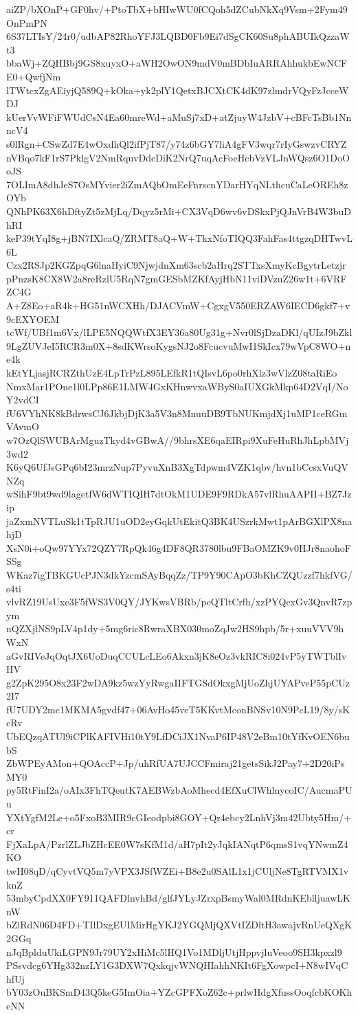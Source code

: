 aiZP/bXOnP+GF0hv/+PtoTbX+bHIwWU0fCQoh5dZCubNkXq9Vsm+2Fym49OnPmPN
6S37LTIsY/24r0/udbAP82RhoYFJ3LQBD0Fb9Ei7dSgCK60Su8phABUIkQzzaWt3
bbaWj+ZQHBbj9GS8xuyxO+aWH2OwON9mdV0mBDbIuARRAhhukbEwNCFE0+QwfjNm
lTWtcxZgAEiyjQ589Q+kOka+yk2plY1QetxBJCXtCK4dK97zlmdrVQyFzJcceWDJ
kUerVvWFiFWUdCsN4Ea60mreWd+aMuSj7xD+atZjuyW4JzbV+cBFcTsBb1NnncV4
s0lRgn+CSwZd7E4wOxdhQl2ifPjT87/y74z6bGY7liA4gFV3wqr7rIyGswzvCRYZ
nVBqo7kF1rS7PklgV2NmRquvDdcDiK2NrQ7uqAcFoeHcbVzVLJnWQsz6O1DoOoJS
7OLImA8dhJeS7OsMYvier2iZmAQbOmEeFnrscnYDarHYqNLthcuCaLeOREh8zOYb
QNhPK63X6hDftyZt5zMjLq/Dqyz5rMi+CX3VqD6wv6vDSkxPjQJnVrB4W3buDhRI
keP39tYqI8g+jBN7IXlcaQ/ZRMT8aQ+W+TkxNfoTIQQ3FahFas4ttgzqDHTwvL6L
Czx2RSJp2KGZpqG6lnaHyiC9NjwjdnXm63scb2aHrq2STTxsXmyKcBgytrLetzjr
pPnzsK8CX8W2a8reRzlU5RqN7gmGESbMZKfAyjHbN11viDVzuZ26w1t+6VRFZC4G
A+Z8Eo+aR4k+HG51nWCXHh/DJACVmW+CgxgV550ERZAW6IECD6gkf7+v9cEXYOEM
tcWf/UBf1m6Vx/lLPE5NQQWtfX3EY36a80Ug31g+Nvr0lSjDzaDKl/qUIzJ9bZkl
9LgZUVJeI5RCR3m0X+8sdKWrsoKygsNJ2o8FcucvuMwI1SkIcx79wVpC8WO+ne4k
kEtYLjasjRCRZthUzE4LpTrPzL895LEfkR1tQIsvL6po0rhXlz3wVlzZ08taRiEo
NmxMar1POne1l0LPp86E1LMW4GxKHnwvxaWByS0aIUXGkMkp64D2VqI/NoY2vdCI
fU6VYhNK8kBdrwsCJ6JkbjDjK3a5V3n8MnuuDB9TbNUKmjdXj1uMP1ceRGmVAvmO
w7OzQlSWUBArMguzTkyd4vGBwA//9bhrsXE6qaEIRpi9XuFeHuRhJhLpbMVj3wd2
K6yQ6UfJsGPq6bI23mrzNup7PyvuXnB3XgTdpwm4VZK1qbv/hvn1bCcsxVuQVNZq
wSihF9bt9wd9lagetfW6dWTIQIH7dtOkM1UDE9F9RDkA57vlRhuAAPII+BZ7Jzip
jaZxmNVTLuSk1tTpRJU1uOD2eyGqkUtEkitQ3BK4USzrkMwt1pArBGXlPX8nahjD
XsN0i+oQw97YYx72QZY7RpQk46g4DF8QR3780lbu9FBaOMZK9v0HJr8naohoFSSg
WKaz7igTBKGUcPJN3dkYzcmSAyBqqZz/TP9Y90CApO3bKhCZQUzzf7hkfVG/s4ti
vlvRZ19UsUxe3F5fWS3V0QY/JYKwsVBRb/peQTltCrfh/xzPYQcxGv3QnvR7zpym
nQZXjlNS9pLV4p1dy+5mg6ric8RwraXBX030moZqJw2HS9hpb/5r+xuuVVV9hWxN
aGvRIVeJqOqtJX6UoDuqCCULcLEo6Akxn3jK8eOz3vkRIC8i024vP5yTWTblIvHV
g2ZpK295O8x23F2wDA9kz5wzYyRwgaIIFTGSdOkxgMjUoZhjUYAPveP55pCUz2I7
fU7UDY2mc1MKMA5gvdf47+06AvHo45veT5KKvtMconBNSv10N9PcL19/8y/sKcRv
UbEQzqATUl9iCPlKAFIVHi10tY9LfDCiJX1NvaP6IP48V2eBm10tYfKvOEN6bubS
ZbWPEyAMon+QOAccP+Jp/uhRfUA7UJCCFmiraj21getsSikJ2Pay7+2D20iPsMY0
py5RtFinI2a/oAIx3FhTQeutK7AEBWzbAoMhecd4EfXuClWhlnycoIC/AucmaPUu
YXtYgfM2Le+o5FxoB3MIR9cGIeodpbi8GOY+Qr4ebcy2LnhVj3m42Ubty5Hm/+cr
FjXaLpA/PzrlZLJbZHcEE0W7sKfM1d/aH7pIt2yJqkIANqtP6qmsS1vqYNwmZ4KO
twH08qD/qCyvtVQ5m7yVPX3JSfWZEi+B8e2u0SAlL1x1jCUljNe8TgRTVMX1vknZ
53mbyCpdXX0FY911QAFDlnvhBd/glfJYLyJZrxpBsmyWal0MRdnKEblljuawLKnW
bZiRdN06D4FD+TIlDxgEUIMirHgYKJ2YGQMjQXVtIZDltH3awajvRnUeQXgK2GGq
nJqBplduUkiLGPN9Jr79UY2xHiMc5lHQ1Vo1MDljUtjHppvjluVeoo9SH3kpxzl9
PSsvdcg6YHg332nzLY1G3DXW7QxkqjvWNQHIahhNKIt6FgXowpcI+N8wIVqChfUj
bY03zOuBKSmD43Q5keG5ImOia+YZcGPFXoZ62c+prlwHdgXfussOoqfcbKOKheNN
